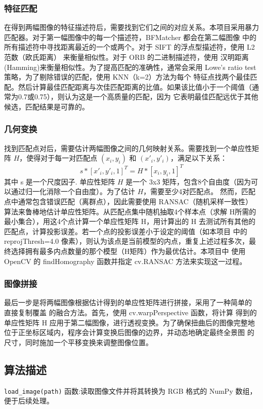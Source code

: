 \documentclass[12pt,a4paper]{article}     %
\begin{document}
\subsubsection{特征匹配}
在得到两幅图像的特征描述符后，需要找到它们之间的对应关系。本项目采用暴力匹配器。对于第一幅图像中的每一个描述符，BFMatcher 都会在第二幅图像
中的所有描述符中寻找距离最近的一个或两个。对于 SIFT 的浮点型描述符，使用 L2 范数（欧氏距离） 来衡量相似性。对于 ORB 的二进制描述符，使用
汉明距离(Hamming)来衡量相似性。为了提高匹配的准确性，通常会采用 Lowe's ratio test 策略，为了剔除错误的匹配，使用 KNN（k=2）方法为每个
特征点找两个最佳匹配。然后计算最佳匹配距离与次佳匹配距离的比值。如果该比值小于一个阈值（通常为0.7或0.75），则认为这是一个高质量的匹配，因为
它表明最佳匹配远优于其他候选，匹配结果是可靠的。
\subsubsection{几何变换}
找到匹配点对后，需要估计两幅图像之间的几何映射关系。需要找到一个单应性矩阵 $H$，使得对于每一对匹配点 $(x_i, y_i)$ 和 $(x'_i, y'_i)$，满足以下关系：
\[
s * [x'_i, y'_i, 1]^T = H * [x_i, y_i, 1]^T
\]
其中 s 是一个尺度因子. 单应性矩阵 $H$ 是一个 3x3 矩阵，包含8个自由度（因为可以通过归一化消除一个自由度）。为了估计 $H$，需要至少4对匹配点。
然而，匹配点中通常包含错误匹配（离群点），因此需要使用 RANSAC（随机采样一致性）算法来鲁棒地估计单应性矩阵。从匹配点集中随机抽取4个样本点（求解
H所需的最小集合），用这4个点计算一个单应性矩阵 H，用计算出的 H 去测试所有其他的匹配点，计算投影误差。若一个点的投影误差小于设定的阈值（如本项目
中的 reprojThresh=4.0 像素），则认为该点是当前模型的内点，重复上述过程多次，最终选择拥有最多内点数量的那个模型（H矩阵）作为最优估计。本项目中
使用 OpenCV 的 findHomography 函数并指定 cv.RANSAC 方法来实现这一过程。

\subsubsection{图像拼接}
最后一步是将两幅图像根据估计得到的单应性矩阵进行拼接，采用了一种简单的 直接复制覆盖 的融合方法。首先，使用 cv.warpPerspective 函数，将计算
得到的单应性矩阵 H 应用于第二幅图像，进行透视变换。为了确保扭曲后的图像完整地位于正坐标区域内，程序会计算变换后图像的边界，并动态地确定最终全景图
的尺寸，同时施加一个平移变换来调整图像位置。

\subsection{算法描述}
\texttt{load\_image(path)} 函数:读取图像文件并将其转换为 RGB 格式的 NumPy 数组，便于后续处理。  
\end{document}

